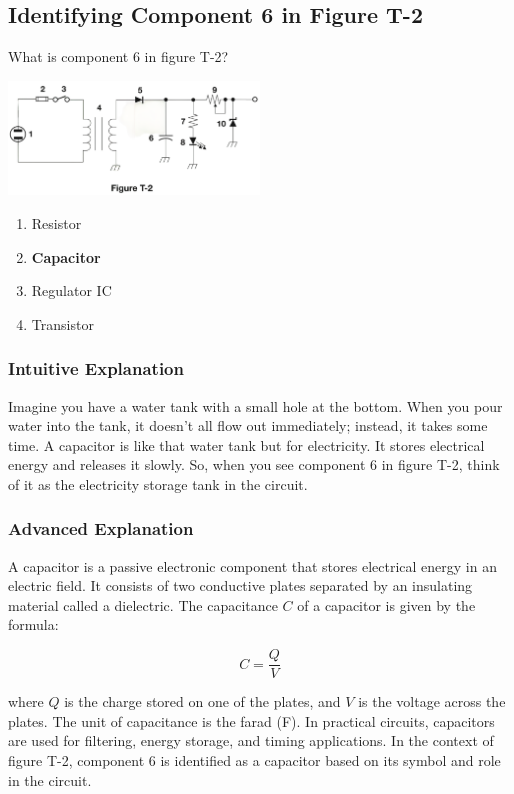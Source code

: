 \subsection{Identifying Component 6 in Figure T-2}
\label{T6C06}

\begin{tcolorbox}[colback=gray!10!white,colframe=black!75!black,title=T6C06]
What is component 6 in figure T-2?

\includegraphics[width=0.5\textwidth]{tech/images/t2.png} 



\begin{enumerate}[label=\Alph*)]
    \item Resistor
    \item \textbf{Capacitor}
    \item Regulator IC
    \item Transistor
\end{enumerate}
\end{tcolorbox}

\subsubsection{Intuitive Explanation}
Imagine you have a water tank with a small hole at the bottom. When you pour water into the tank, it doesn't all flow out immediately; instead, it takes some time. A capacitor is like that water tank but for electricity. It stores electrical energy and releases it slowly. So, when you see component 6 in figure T-2, think of it as the electricity storage tank in the circuit.

\subsubsection{Advanced Explanation}
A capacitor is a passive electronic component that stores electrical energy in an electric field. It consists of two conductive plates separated by an insulating material called a dielectric. The capacitance \( C \) of a capacitor is given by the formula:

\[
C = \frac{Q}{V}
\]

where \( Q \) is the charge stored on one of the plates, and \( V \) is the voltage across the plates. The unit of capacitance is the farad (F). In practical circuits, capacitors are used for filtering, energy storage, and timing applications. In the context of figure T-2, component 6 is identified as a capacitor based on its symbol and role in the circuit.

